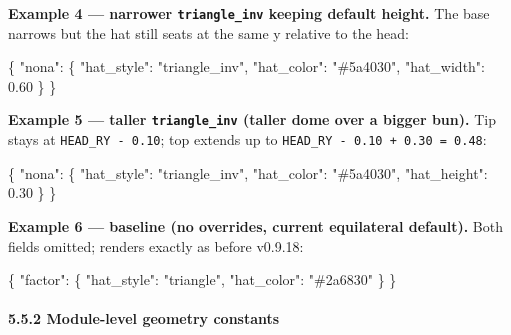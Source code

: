 \documentclass[
  11pt,
]{book}
\newenvironment{Shaded}{}{}
\newcommand{\DataTypeTok}[1]{\textcolor[rgb]{0.56,0.13,0.00}{#1}}
\newcommand{\FloatTok}[1]{\textcolor[rgb]{0.25,0.63,0.44}{#1}}
\newcommand{\FunctionTok}[1]{\textcolor[rgb]{0.02,0.16,0.49}{#1}}
\newcommand{\StringTok}[1]{\textcolor[rgb]{0.25,0.44,0.63}{#1}}
\begin{document}
\textbf{Example 4 --- narrower \texttt{triangle\_inv} keeping default
height.} The base narrows but the hat still seats at the same y
relative to the head:

\begin{Shaded}
\begin{Highlighting}[]
\FunctionTok{\{}
  \DataTypeTok{"nona"}\FunctionTok{:} \FunctionTok{\{}
    \DataTypeTok{"hat\_style"}\FunctionTok{:} \StringTok{"triangle\_inv"}\FunctionTok{,}
    \DataTypeTok{"hat\_color"}\FunctionTok{:} \StringTok{"\#5a4030"}\FunctionTok{,}
    \DataTypeTok{"hat\_width"}\FunctionTok{:} \FloatTok{0.60}
  \FunctionTok{\}}
\FunctionTok{\}}
\end{Highlighting}
\end{Shaded}

\textbf{Example 5 --- taller \texttt{triangle\_inv} (taller dome over a
bigger bun).} Tip stays at \texttt{HEAD\_RY\ -\ 0.10}; top extends up
to \texttt{HEAD\_RY\ -\ 0.10\ +\ 0.30\ =\ 0.48}:

\begin{Shaded}
\begin{Highlighting}[]
\FunctionTok{\{}
  \DataTypeTok{"nona"}\FunctionTok{:} \FunctionTok{\{}
    \DataTypeTok{"hat\_style"}\FunctionTok{:}  \StringTok{"triangle\_inv"}\FunctionTok{,}
    \DataTypeTok{"hat\_color"}\FunctionTok{:}  \StringTok{"\#5a4030"}\FunctionTok{,}
    \DataTypeTok{"hat\_height"}\FunctionTok{:} \FloatTok{0.30}
  \FunctionTok{\}}
\FunctionTok{\}}
\end{Highlighting}
\end{Shaded}

\textbf{Example 6 --- baseline (no overrides, current equilateral
default).} Both fields omitted; renders exactly as before v0.9.18:

\begin{Shaded}
\begin{Highlighting}[]
\FunctionTok{\{}
  \DataTypeTok{"factor"}\FunctionTok{:} \FunctionTok{\{}
    \DataTypeTok{"hat\_style"}\FunctionTok{:} \StringTok{"triangle"}\FunctionTok{,}
    \DataTypeTok{"hat\_color"}\FunctionTok{:} \StringTok{"\#2a6830"}
  \FunctionTok{\}}
\FunctionTok{\}}
\end{Highlighting}
\end{Shaded}

\paragraph{5.5.2 Module-level geometry
constants}\label{module-level-geometry-constants}
\end{document}
